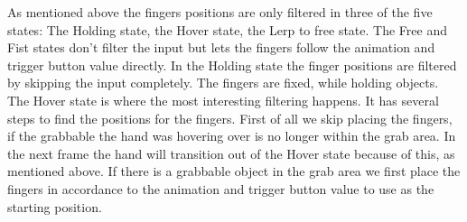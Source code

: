 
As mentioned above the fingers positions are only filtered in three of the five states: The Holding state, the Hover state, the Lerp to free state. The Free and Fist states don't filter the input but lets the fingers follow the animation and trigger button value directly. In the Holding state the finger positions are filtered by skipping the input completely. The fingers are fixed, while holding objects. The Hover state is where the most interesting filtering happens. It has several steps to find the positions for the fingers. First of all we skip placing the fingers, if the grabbable the hand was hovering over is no longer within the grab area. In the next frame the hand will transition out of the Hover state because of this, as mentioned above. If there is a grabbable object in the grab area we first place the fingers in accordance to the animation and trigger button value to use as the starting position.

